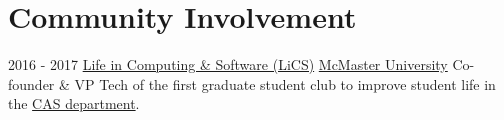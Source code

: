\documentclass[letterpaper]{twentysecondcv} %
\begin{document}
\vspace{-1.5em}
\section{Community Involvement}
\vspace{-.5em}
\begin{twenty}
	\twentyitem
	{2016 - 2017}
	{}
	{\href{https://lics.cas.mcmaster.ca/node/17}{Life in Computing \& Software (LiCS)}}
	{\href{https://www.mcmaster.ca/}{McMaster University}}
	{}
	{Co-founder \& VP Tech of the first graduate student club to improve student life in the \href{https://www.eng.mcmaster.ca/cas}{CAS department}.
  }
\end{twenty}
\end{document}
